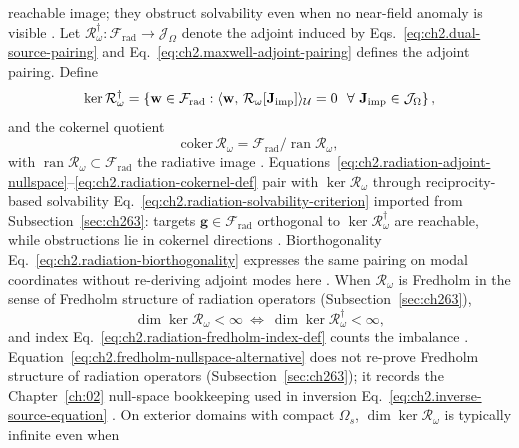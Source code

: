 reachable image; they obstruct solvability even when no near-field anomaly is visible
\cite{stratton1941}. Let \(\mathcal{R}_\omega^{\dagger}:\mathcal{F}_{\mathrm{rad}}\to\mathcal{J}_\Omega\) denote
the adjoint induced by Eqs.~\eqref{eq:ch2.dual-source-pairing} and
Eq.~\eqref{eq:ch2.maxwell-adjoint-pairing} defines the adjoint pairing. Define
\begin{equation}
\label{eq:ch2.radiation-adjoint-nullspace}
\ker\mathcal{R}_\omega^{\dagger}
=
\left\{
\mathbf{w}\in\mathcal{F}_{\mathrm{rad}}:
\langle \mathbf{w},\,\mathcal{R}_\omega[\mathbf{J}_{\mathrm{imp}}]\rangle_{\mathcal{U}}=0
\ \ \forall\ \mathbf{J}_{\mathrm{imp}}\in\mathcal{J}_\Omega
\right\},
\end{equation}
and the cokernel quotient
\begin{equation}
\label{eq:ch2.radiation-cokernel-def}
\mathrm{coker}\,\mathcal{R}_\omega
=
\mathcal{F}_{\mathrm{rad}}\big/\operatorname{ran}\mathcal{R}_\omega,
\end{equation}
with \(\operatorname{ran}\mathcal{R}_\omega\subset\mathcal{F}_{\mathrm{rad}}\) the radiative
image \cite{stratton1941}. Equations~\eqref{eq:ch2.radiation-adjoint-nullspace}--\eqref{eq:ch2.radiation-cokernel-def}
pair with \(\ker\mathcal{R}_\omega\) through reciprocity-based solvability
Eq.~\eqref{eq:ch2.radiation-solvability-criterion} imported from Subsection~\ref{sec:ch263}:
targets \(\mathbf{g}\in\mathcal{F}_{\mathrm{rad}}\) orthogonal to
\(\ker\mathcal{R}_\omega^{\dagger}\) are reachable, while obstructions lie in cokernel
directions \cite{stratton1941}. Biorthogonality Eq.~\eqref{eq:ch2.radiation-biorthogonality}
expresses the same pairing on modal coordinates without re-deriving adjoint modes here
\cite{harrington2001}.
When \(\mathcal{R}_\omega\) is Fredholm in the sense of Fredholm structure of radiation operators (Subsection~\ref{sec:ch263}),
\begin{equation}
\label{eq:ch2.fredholm-nullspace-alternative}
\dim\ker\mathcal{R}_\omega<\infty
\ \Longleftrightarrow\
\dim\ker\mathcal{R}_\omega^{\dagger}<\infty,
\end{equation}
and index Eq.~\eqref{eq:ch2.radiation-fredholm-index-def} counts the imbalance
\cite{stratton1941}. Equation~\eqref{eq:ch2.fredholm-nullspace-alternative}
does not re-prove Fredholm structure of radiation operators (Subsection~\ref{sec:ch263}); it records the
Chapter~\ref{ch:02} null-space bookkeeping used in inversion
Eq.~\eqref{eq:ch2.inverse-source-equation} \cite{stratton1941}. On exterior domains with
compact \(\Omega_s\), \(\dim\ker\mathcal{R}_\omega\) is typically infinite even when
